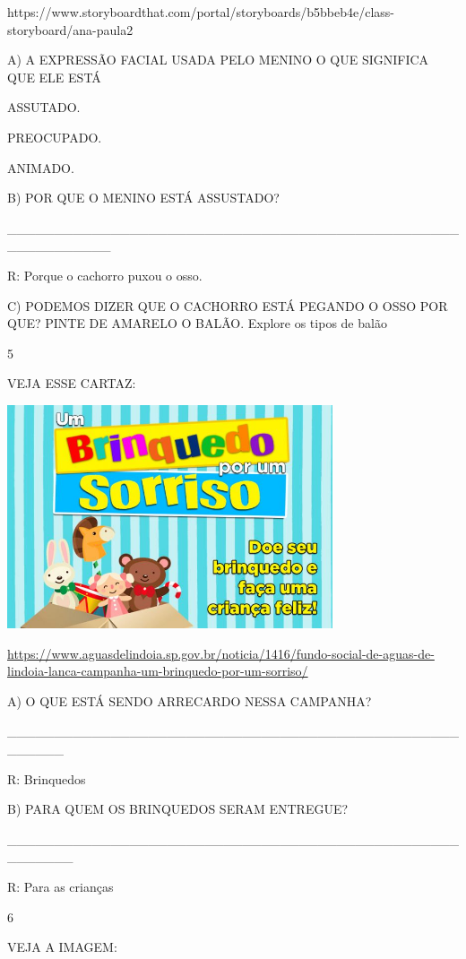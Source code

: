{{{{{{https://www.storyboardthat.com/portal/storyboards/b5bbeb4e/class-storyboard/ana-paula2

A) A EXPRESSÃO FACIAL USADA PELO MENINO O QUE SIGNIFICA QUE ELE ESTÁ

ASSUTADO.

PREOCUPADO.

ANIMADO.

B) POR QUE O MENINO ESTÁ ASSUSTADO?

\_\_\_\_\_\_\_\_\_\_\_\_\_\_\_\_\_\_\_\_\_\_\_\_\_\_\_\_\_\_\_\_\_\_\_\_\_\_\_\_\_\_\_\_\_\_\_\_\_\_\_\_\_\_\_\_\_\_\_

R: Porque o cachorro puxou o osso.

C) PODEMOS DIZER QUE O CACHORRO ESTÁ PEGANDO O OSSO POR QUE? PINTE DE
AMARELO O BALÃO. Explore os tipos de balão

\num{5}

VEJA ESSE CARTAZ:

\includegraphics[width=3.78169in,height=2.59560in]{media/image132.jpeg}

\url{https://www.aguasdelindoia.sp.gov.br/noticia/1416/fundo-social-de-aguas-de-lindoia-lanca-campanha-um-brinquedo-por-um-sorriso/}

A) O QUE ESTÁ SENDO ARRECARDO NESSA CAMPANHA?

\_\_\_\_\_\_\_\_\_\_\_\_\_\_\_\_\_\_\_\_\_\_\_\_\_\_\_\_\_\_\_\_\_\_\_\_\_\_\_\_\_\_\_\_\_\_\_\_\_\_\_\_\_\_

R: Brinquedos

B) PARA QUEM OS BRINQUEDOS SERAM ENTREGUE?

\_\_\_\_\_\_\_\_\_\_\_\_\_\_\_\_\_\_\_\_\_\_\_\_\_\_\_\_\_\_\_\_\_\_\_\_\_\_\_\_\_\_\_\_\_\_\_\_\_\_\_\_\_\_\_

R: Para as crianças

\num{6}

VEJA A IMAGEM:

}}}}}}
